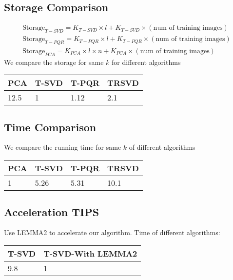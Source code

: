 \documentclass[english]{article}
\newcommand{\<}{\langle}
\renewcommand{\>}{\rangle}
\theoremstyle{definition}
\begin{document}
\subsection{Storage Comparison}
\begin{align*}
\text{Storage}_{T-SVD} = K_{T-SVD} \times  l + K_{T-SVD} \times (\text{num of training images})\\
\text{Storage}_{T-PQR} = K_{T-PQR} \times  l + K_{T-PQR} \times (\text{num of training images})\\
\text{Storage}_{PCA} = K_{PCA} \times  l \times n + K_{PCA} \times (\text{num of training images})
\end{align*}
We compare the storage for same $k$ for different algorithms
\begin{table}[H]
\centering
\begin{tabular}{llll}
\hline
PCA & T-SVD & T-PQR & TRSVD \\
\hline
12.5   & 1  & 1.12  & 2.1
\end{tabular}
\end{table}


\subsection{Time Comparison}
We compare the running time for same $k$ of different algorithms
\begin{table}[H]
\centering
\begin{tabular}{llll}
\hline
PCA & T-SVD & T-PQR & TRSVD \\
\hline
1   & 5.26  & 5.31  & 10.1 
\end{tabular}
\end{table}

\subsection{Acceleration TIPS}
Use LEMMA2 to accelerate our algorithm. Time of different algorithms:
\begin{table}[H]
\centering
\begin{tabular}{ll}
\hline
T-SVD & T-SVD-With LEMMA2\\
\hline
9.8   & 1  
\end{tabular}
\end{table}

\newpage
\nocite{*}


\end{document}
